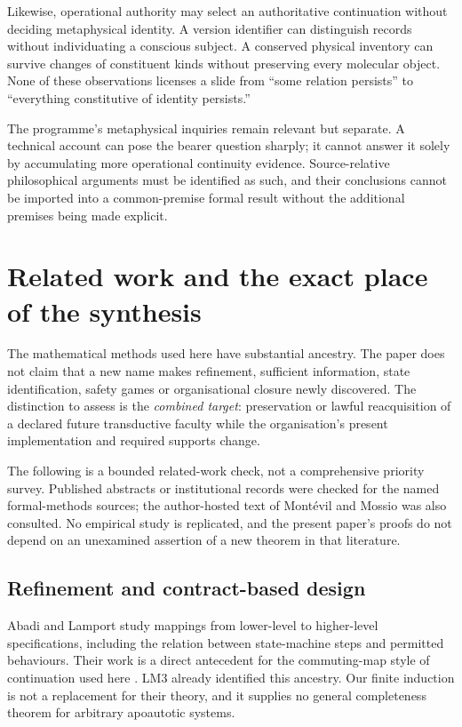 Likewise, operational authority may select an authoritative continuation without deciding metaphysical identity. A version identifier can distinguish records without individuating a conscious subject. A conserved physical inventory can survive changes of constituent kinds without preserving every molecular object. None of these observations licenses a slide from ``some relation persists'' to ``everything constitutive of identity persists.''

The programme's metaphysical inquiries remain relevant but separate. A technical account can pose the bearer question sharply; it cannot answer it solely by accumulating more operational continuity evidence. Source-relative philosophical arguments must be identified as such, and their conclusions cannot be imported into a common-premise formal result without the additional premises being made explicit.

\section{Related work and the exact place of the synthesis}
\label{sec:related}

The mathematical methods used here have substantial ancestry. The paper does not claim that a new name makes refinement, sufficient information, state identification, safety games or organisational closure newly discovered. The distinction to assess is the \emph{combined target}: preservation or lawful reacquisition of a declared future transductive faculty while the organisation's present implementation and required supports change.

The following is a bounded related-work check, not a comprehensive priority survey. Published abstracts or institutional records were checked for the named formal-methods sources; the author-hosted text of Mont\'evil and Mossio was also consulted. No empirical study is replicated, and the present paper's proofs do not depend on an unexamined assertion of a new theorem in that literature.

\subsection{Refinement and contract-based design}

Abadi and Lamport study mappings from lower-level to higher-level specifications, including the relation between state-machine steps and permitted behaviours. Their work is a direct antecedent for the commuting-map style of continuation used here \cite{AL}. LM3 already identified this ancestry. Our finite induction is not a replacement for their theory, and it supplies no general completeness theorem for arbitrary apoautotic systems.

